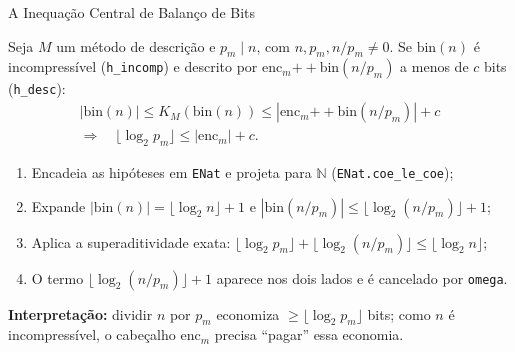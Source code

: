 \documentclass[10pt, aspectratio=43]{beamer}
\begin{document}
\begin{frame}{A Inequação Central de Balanço de Bits}
    \begin{tcolorbox}[pucbox, title=Teorema (\texttt{log2\_nthPrime\_le\_code\_length})]
        \small
        Seja $M$ um método de descrição e $p_m \mid n$, com $n, p_m, n/p_m \neq 0$. Se $\text{bin}(n)$ é incompressível (\texttt{h\_incomp}) e descrito por $\text{enc}_m \mathbin{+\!+} \text{bin}(n/p_m)$ a menos de $c$ bits (\texttt{h\_desc}):
        \begin{gather*}
            |\text{bin}(n)| \le K_M(\text{bin}(n)) \le |\text{enc}_m \mathbin{+\!+} \text{bin}(n/p_m)| + c \\
            \Longrightarrow\quad \lfloor\log_2 p_m\rfloor \le |\text{enc}_m| + c.
        \end{gather*}
    \end{tcolorbox}
    \footnotesize
    \begin{enumerate}
        \item Encadeia as hipóteses em \texttt{ENat} e projeta para $\mathbb{N}$ (\texttt{ENat.coe\_le\_coe});
        \item Expande $|\text{bin}(n)| = \lfloor\log_2 n\rfloor + 1$ e $|\text{bin}(n/p_m)| \le \lfloor\log_2(n/p_m)\rfloor + 1$;
        \item Aplica a superaditividade exata: $\lfloor\log_2 p_m\rfloor + \lfloor\log_2(n/p_m)\rfloor \le \lfloor\log_2 n\rfloor$;
        \item O termo $\lfloor\log_2(n/p_m)\rfloor + 1$ aparece nos dois lados e é cancelado por \texttt{omega}.
    \end{enumerate}
    \small
    \textbf{Interpretação:} dividir $n$ por $p_m$ economiza $\ge \lfloor\log_2 p_m\rfloor$ bits; como $n$ é incompressível, o cabeçalho $\text{enc}_m$ precisa ``pagar'' essa economia.
\end{frame}
\end{document}
